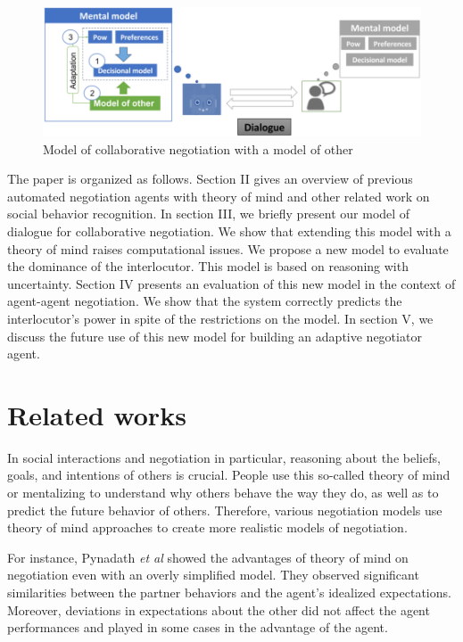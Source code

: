\documentclass[conference, letterpaper]{IEEEtran}
\begin{document}
	
	
		\begin{figure}
			\centering
			\includegraphics[width=0.75\linewidth, height= 0.2\textheight]{figs/model.png}
			\caption{Model of collaborative negotiation with a model of other} 
			\label{fig:schema-general}
		\end{figure} 
	

		The paper is organized as follows. Section II gives an overview of previous automated negotiation agents with theory of mind and other related work on social behavior recognition. In section III, we briefly present our model of dialogue for collaborative negotiation. We show that extending this model with a theory of mind raises computational issues. We propose a new model to evaluate the dominance of the interlocutor. This model is based on reasoning with uncertainty. Section IV presents an evaluation of this new model in the context of agent-agent negotiation. We show that the system correctly predicts the interlocutor's power in spite of the restrictions on the model. In section V, we discuss the future use of this new model for building an adaptive negotiator agent.
	
	
	\section{Related works}
	
	In social interactions and negotiation in particular, reasoning about the beliefs, goals, and intentions of others is crucial. People use this so-called theory of mind \cite{premack1978does} or mentalizing to understand why others behave the way they do, as well as to predict the future behavior of others. Therefore, various negotiation models use theory of mind approaches to create  more realistic models of negotiation. 
	
	For instance, Pynadath \textit{et al}\cite{pynadath2013you} showed the advantages of theory of mind on negotiation even with an overly simplified model. They observed significant similarities between	the partner behaviors and the agent's idealized expectations. Moreover, deviations in expectations about the other did not affect the agent performances and played in some cases in the advantage of the agent.
	
\end{document}

